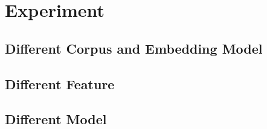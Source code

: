 \section{Experiment}

\subsection{Different Corpus and Embedding Model}



\subsection{Different Feature}



\subsection{Different Model}


